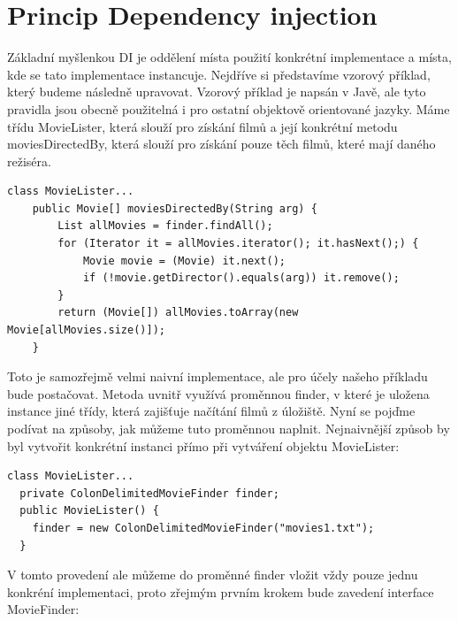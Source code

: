 \documentclass[a4paper,conference]{IEEEtran}
\begin{document}
\section{Princip Dependency injection}
Základní myšlenkou DI je oddělení místa použití konkrétní implementace a místa, kde se tato implementace instancuje. Nejdříve si představíme vzorový příklad, který budeme následně upravovat. Vzorový příklad je napsán v Javě, ale tyto pravidla jsou obecně použitelná i pro ostatní objektově orientované jazyky.
Máme třídu MovieLister, která slouží pro získání filmů a její konkrétní metodu moviesDirectedBy, která slouží pro získání pouze těch filmů, které mají daného režiséra.

\begin{lstlisting}
class MovieLister...
    public Movie[] moviesDirectedBy(String arg) {
        List allMovies = finder.findAll();
        for (Iterator it = allMovies.iterator(); it.hasNext();) {
            Movie movie = (Movie) it.next();
            if (!movie.getDirector().equals(arg)) it.remove();
        }
        return (Movie[]) allMovies.toArray(new Movie[allMovies.size()]);
    }
\end{lstlisting}

Toto je samozřejmě velmi naivní implementace, ale pro účely našeho příkladu bude postačovat. Metoda uvnitř využívá proměnnou finder, v které je uložena instance jiné třídy, která zajišťuje načítání filmů z úložiště. Nyní se pojďme podívat na způsoby, jak můžeme tuto proměnnou naplnit.
Nejnaivnější způsob by byl vytvořit konkrétní instanci přímo při vytváření objektu MovieLister:

\lstset{language=Java, caption=Možné naplnění proměnné finder, label=listing:Java}
\begin{lstlisting}
class MovieLister...
  private ColonDelimitedMovieFinder finder;
  public MovieLister() {
    finder = new ColonDelimitedMovieFinder("movies1.txt");
  }
\end{lstlisting}

V tomto provedení ale můžeme do proměnné finder vložit vždy pouze jednu konkréní implementaci, proto zřejmým prvním krokem bude zavedení interface MovieFinder: 
\end{document}
